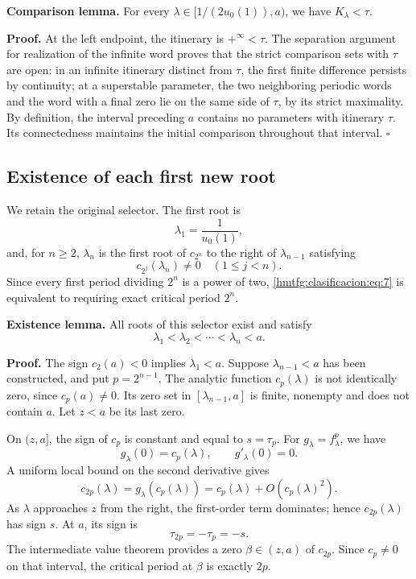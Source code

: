 \textbf{Comparison lemma.} For every \(\lambda\in[1/(2u_0(1)),a)\), we have \(K_\lambda<\tau\).

\textbf{Proof.} At the left endpoint, the itinerary is \(+^\infty<\tau\). The separation argument for realization of the infinite word proves that the strict comparison sets with \(\tau\) are open: in an infinite itinerary distinct from \(\tau\), the first finite difference persists by continuity; at a superstable parameter, the two neighboring periodic words and the word with a final zero lie on the same side of \(\tau\), by its strict maximality. By definition, the interval preceding \(a\) contains no parameters with itinerary \(\tau\). Its connectedness maintains the initial comparison throughout that interval. \(\square\)


\subsection{Existence of each first new root}
\label{hmtfg:clasificacion:4}

We retain the original selector. The first root is
\[
\lambda_1=\frac1{u_0(1)},
\]
and, for \(n\ge2\), \(\lambda_n\) is the first root of \(c_{2^n}\) to the right of \(\lambda_{n-1}\) satisfying
\begin{equation}
c_{2^j}(\lambda_n)\ne0\quad(1\le j<n).
\label{hmtfg:clasificacion:eq:7}
\end{equation}
Since every first period dividing \(2^n\) is a power of two, \eqref{hmtfg:clasificacion:eq:7} is equivalent to requiring exact critical period \(2^n\).

\textbf{Existence lemma.} All roots of this selector exist and satisfy
\begin{equation}
\lambda_1<\lambda_2<\cdots<\lambda_n<a.
\label{hmtfg:clasificacion:eq:8}
\end{equation}

\textbf{Proof.} The sign \(c_2(a)<0\) implies \(\lambda_1<a\). Suppose \(\lambda_{n-1}<a\) has been constructed, and put \(p=2^{n-1}\). The analytic function \(c_p(\lambda)\) is not identically zero, since \(c_p(a)\ne0\). Its zero set in \([\lambda_{n-1},a]\) is finite, nonempty and does not contain \(a\). Let \(z<a\) be its last zero.

On \((z,a]\), the sign of \(c_p\) is constant and equal to \(s=\tau_p\). For \(g_\lambda=f_\lambda^p\), we have
\[
g_\lambda(0)=c_p(\lambda),\qquad g'_\lambda(0)=0.
\]
A uniform local bound on the second derivative gives
\begin{equation}
c_{2p}(\lambda)
=g_\lambda(c_p(\lambda))
=c_p(\lambda)+O(c_p(\lambda)^2).
\label{hmtfg:clasificacion:eq:9}
\end{equation}
As \(\lambda\) approaches \(z\) from the right, the first-order term dominates; hence \(c_{2p}(\lambda)\) has sign \(s\). At \(a\), its sign is
\[
\tau_{2p}=-\tau_p=-s.
\]
The intermediate value theorem provides a zero \(\beta\in(z,a)\) of \(c_{2p}\). Since \(c_p\ne0\) on that interval, the critical period at \(\beta\) is exactly \(2p\).

